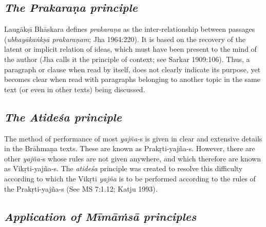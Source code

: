 \subsection*{\textit{The Prakaraṇa principle}}

Laugākṣī Bhāskara defines \textit{prakaraṇa} as the inter-relationship between passages (\textit{ubhayākaṅkṣā prakaraṇam}; Jha 1964:220). It is based on the recovery of the latent or implicit relation of ideas, which must have been present to the mind of the author (Jha calls it the principle of context; see Sarkar 1909:106). Thus, a paragraph or clause when read by itself, does not clearly indicate its purpose, yet becomes clear when read with paragraphs belonging to another topic in the same text (or even in other texts) being discussed.


\subsection*{\textit{The Atideśa principle}}

The method of performance of most \textit{yajña-}s is given in clear and extensive details in the Brāhmaṇa texts. These are known as Prakṛti-yajña-s. However, there are other \textit{yajña-}s whose rules are not given anywhere, and which therefore are known as Vikṛti-yajña-s. The \textit{atideśa} principle was created to resolve this difficulty according to which the Vikṛti \textit{yajña} is to be performed according to the rules of the Prakṛti-yajña-s (See MS 7:1.12; Katju 1993).


\subsection*{\textit{Application of Mīmāṁsā principles}}

